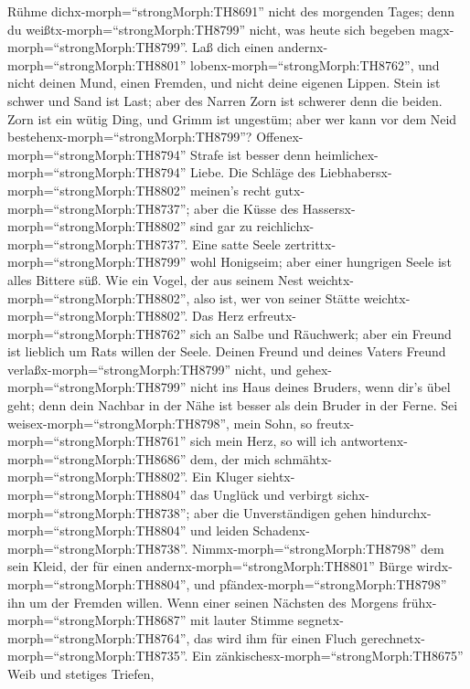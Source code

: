  Rühme dichx-morph=``strongMorph:TH8691'' nicht des
morgenden Tages; denn du weißtx-morph=``strongMorph:TH8799'' nicht, was
heute sich begeben magx-morph=``strongMorph:TH8799''.  Laß
dich einen andernx-morph=``strongMorph:TH8801''
lobenx-morph=``strongMorph:TH8762'', und nicht deinen Mund, einen
Fremden, und nicht deine eigenen Lippen.  Stein ist schwer
und Sand ist Last; aber des Narren Zorn ist schwerer denn die beiden.
 Zorn ist ein wütig Ding, und Grimm ist ungestüm; aber wer
kann vor dem Neid bestehenx-morph=``strongMorph:TH8799''? 
Offenex-morph=``strongMorph:TH8794'' Strafe ist besser denn
heimlichex-morph=``strongMorph:TH8794'' Liebe.  Die Schläge
des Liebhabersx-morph=``strongMorph:TH8802'' meinen's recht
gutx-morph=``strongMorph:TH8737''; aber die Küsse des
Hassersx-morph=``strongMorph:TH8802'' sind gar zu
reichlichx-morph=``strongMorph:TH8737''.  Eine satte Seele
zertrittx-morph=``strongMorph:TH8799'' wohl Honigseim; aber einer
hungrigen Seele ist alles Bittere süß.  Wie ein Vogel, der
aus seinem Nest weichtx-morph=``strongMorph:TH8802'', also ist, wer von
seiner Stätte weichtx-morph=``strongMorph:TH8802''.  Das
Herz erfreutx-morph=``strongMorph:TH8762'' sich an Salbe und Räuchwerk;
aber ein Freund ist lieblich um Rats willen der Seele. 
Deinen Freund und deines Vaters Freund
verlaßx-morph=``strongMorph:TH8799'' nicht, und
gehex-morph=``strongMorph:TH8799'' nicht ins Haus deines Bruders, wenn
dir's übel geht; denn dein Nachbar in der Nähe ist besser als dein
Bruder in der Ferne.  Sei
weisex-morph=``strongMorph:TH8798'', mein Sohn, so
freutx-morph=``strongMorph:TH8761'' sich mein Herz, so will ich
antwortenx-morph=``strongMorph:TH8686'' dem, der mich
schmähtx-morph=``strongMorph:TH8802''.  Ein Kluger
siehtx-morph=``strongMorph:TH8804'' das Unglück und verbirgt
sichx-morph=``strongMorph:TH8738''; aber die Unverständigen gehen
hindurchx-morph=``strongMorph:TH8804'' und leiden
Schadenx-morph=``strongMorph:TH8738''. 
Nimmx-morph=``strongMorph:TH8798'' dem sein Kleid, der für einen
andernx-morph=``strongMorph:TH8801'' Bürge
wirdx-morph=``strongMorph:TH8804'', und
pfändex-morph=``strongMorph:TH8798'' ihn um der Fremden willen.
 Wenn einer seinen Nächsten des Morgens
frühx-morph=``strongMorph:TH8687'' mit lauter Stimme
segnetx-morph=``strongMorph:TH8764'', das wird ihm für einen Fluch
gerechnetx-morph=``strongMorph:TH8735''.  Ein
zänkischesx-morph=``strongMorph:TH8675'' Weib und stetiges Triefen,
